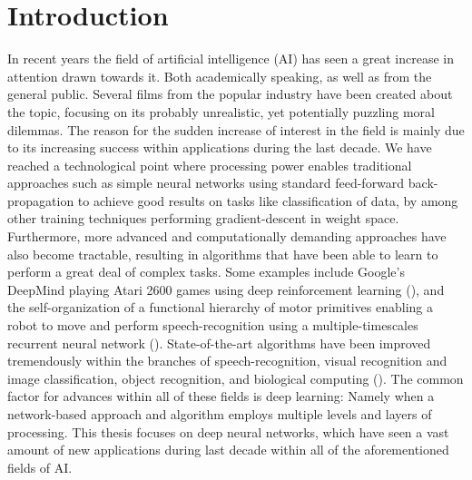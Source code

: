 
\chapter{Introduction}

In recent years the field of artificial intelligence (AI) has seen a great increase in attention drawn towards it. Both academically speaking, as well as from the general public. Several films from the popular industry have been created about the topic, focusing on its probably unrealistic, yet potentially puzzling moral dilemmas. The reason for the sudden increase of interest in the field is mainly due to its increasing success within applications during the last decade. We have reached a technological point where processing power enables traditional approaches such as simple neural networks using standard feed-forward back-propagation to achieve good results on tasks like classification of data, by among other training techniques performing gradient-descent in weight space. Furthermore, more advanced and computationally demanding approaches have also become tractable, resulting in algorithms that have been able to learn to perform a great deal of complex tasks. Some examples include Google's DeepMind playing Atari 2600 games using deep reinforcement learning (\cite{Mnih2015}), and the self-organization of a functional hierarchy of motor primitives enabling a robot to move and perform speech-recognition using a multiple-timescales recurrent neural network (\cite{Tani2014}). State-of-the-art algorithms have been improved tremendously within the branches of speech-recognition, visual recognition and image classification, object recognition, and biological computing (\cite{LeCun2015}). The common factor for advances within all of these fields is deep learning: Namely when a network-based approach and algorithm employs multiple levels and layers of processing. This thesis focuses on deep neural networks, which have seen a vast amount of new applications during last decade within all of the aforementioned fields of AI.


